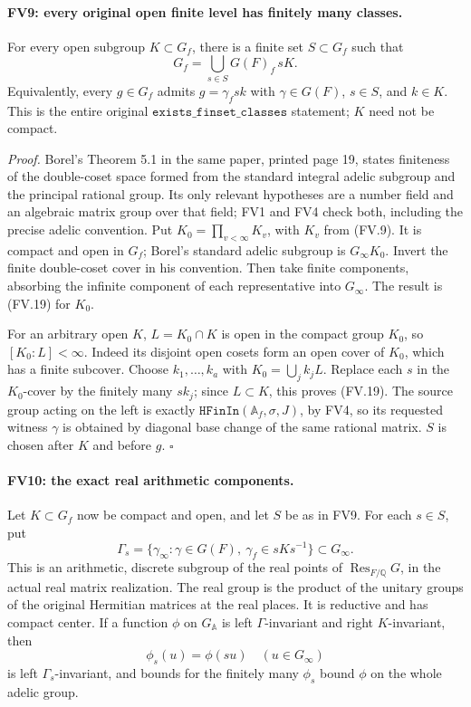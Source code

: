 \paragraph{FV9: every original open finite level has finitely many classes.}
\label{claim:FV9}
For every open subgroup \(K\subset G_f\), there is a finite set
\(S\subset G_f\) such that
\[
 G_f=\bigcup_{s\in S}G(F)_f\,sK.
 \tag{FV.19}
\]
Equivalently, every \(g\in G_f\) admits
\(g=\gamma_fsk\) with \(\gamma\in G(F)\), \(s\in S\), and \(k\in K\).
This is the entire original \(\texttt{exists\_finset\_classes}\)
statement; \(K\) need not be compact.

\emph{Proof.}
Borel's Theorem 5.1 in the same paper, printed page 19, states
finiteness of the double-coset space formed from the standard
integral adelic subgroup and the principal rational group.
Its only relevant hypotheses are a number field and an algebraic
matrix group over that field; FV1 and FV4 check both, including
the precise adelic convention.  Put
\(K_0=\prod_{v<\infty}K_v\), with \(K_v\) from (FV.9).
It is compact and open in \(G_f\); Borel's standard adelic subgroup
is \(G_\infty K_0\).  Invert the finite double-coset cover in his
convention.  Then take finite components, absorbing the infinite
component of each representative into \(G_\infty\).
The result is (FV.19) for \(K_0\).

For an arbitrary open \(K\), \(L=K_0\cap K\) is open in the compact
group \(K_0\), so \([K_0:L]<\infty\).  Indeed its disjoint open
cosets form an open cover of \(K_0\), which has a finite subcover.
Choose \(k_1,\ldots,k_a\) with \(K_0=\bigcup_j k_jL\).
Replace each \(s\) in the \(K_0\)-cover by the finitely many
\(sk_j\); since \(L\subset K\), this proves (FV.19).
The source group acting on the left is exactly
\(\texttt{HFinIn}(\mathbb A_f,\sigma,J)\), by FV4, so its requested
witness \(\gamma\) is obtained by diagonal base change of the same
rational matrix.  \(S\) is chosen after \(K\) and before \(g\).
\(\square\)

\paragraph{FV10: the exact real arithmetic components.}
\label{claim:FV10}
Let \(K\subset G_f\) now be compact and open, and let \(S\) be as
in FV9.  For each \(s\in S\), put
\[
 \Gamma_s=\{\gamma_\infty:\gamma\in G(F),\
                      \gamma_f\in sKs^{-1}\}\subset G_\infty.
 \tag{FV.20}
\]
This is an arithmetic, discrete subgroup of the real points of
\(\operatorname{Res}_{F/\mathbb Q}G\), in the actual real matrix
realization.  The real group is the product of the unitary groups
of the original Hermitian matrices at the real places.  It is
reductive and has compact center.  If a function \(\phi\) on
\(G_{\mathbb A}\) is left \(\Gamma\)-invariant and right
\(K\)-invariant, then
\[
       \phi_s(u)=\phi(su)\quad(u\in G_\infty)
 \tag{FV.21}
\]
is left \(\Gamma_s\)-invariant, and bounds for the finitely many
\(\phi_s\) bound \(\phi\) on the whole adelic group.

